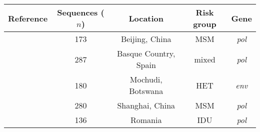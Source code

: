 \begin{tabular}{ccccc}
  Reference & Sequences ($n$) & Location & Risk group & Gene \\
  \hline
  \textcite{wang2015targeting} & 173 & Beijing, China & MSM & \textit{pol} \\
  \textcite{cuevas2009hiv} & 287 & Basque Country, Spain & mixed & \textit{pol} \\
  \textcite{novitsky2013phylogenetic} & \multirow{2}{*}{180} &
  \multirow{2}{*}{Mochudi, Botswana} & \multirow{2}{*}{HET} &
  \multirow{2}{*}{\textit{env}} \\ \textcite{novitsky2014impact} \\
  \textcite{li2015hiv} & 280 & Shanghai, China & MSM & \textit{pol} \\
  \textcite{niculescu2015recent} & 136 & Romania & IDU & \textit{pol} \\
  \hline
\end{tabular}
